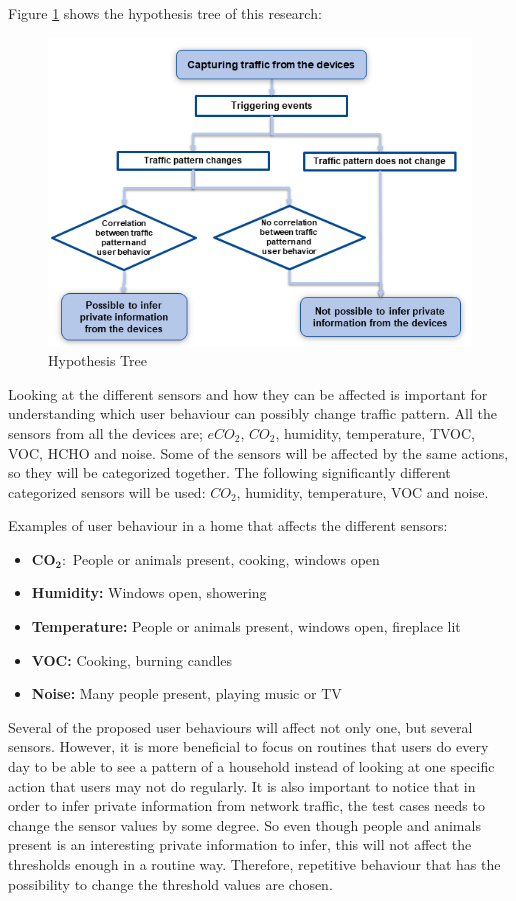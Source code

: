 Figure \ref{fig:HypothesisTree} shows the hypothesis tree of this research:

\begin{figure} [H]
    \includegraphics[width=1\textwidth]{figures/Hypothesistree.png}
    \caption{Hypothesis Tree}
    \label{fig:HypothesisTree}
\end{figure}

Looking at the different sensors and how they can be affected is important for understanding which user behaviour can possibly change traffic pattern. All the sensors from all the devices are; \(eCO_2\), \(CO_2\), humidity, temperature, \gls{TVOC}, \gls{VOC}, HCHO and noise. Some of the sensors will be affected by the same actions, so they will be categorized together. The following significantly different categorized sensors will be used: \(CO_2\), humidity, temperature, VOC and noise. 

Examples of user behaviour in a home that affects the different sensors:
\begin{itemize}
    \item $\mathbf{CO_2:}$ People or animals present, cooking, windows open
    \item \textbf{Humidity:} Windows open, showering
    \item \textbf{Temperature:} People or animals present, windows open, fireplace lit
    \item \textbf{VOC:} Cooking, burning candles
    \item \textbf{Noise:} Many people present, playing music or TV
\end{itemize}

Several of the proposed user behaviours will affect not only one, but several sensors. However, it is more beneficial to focus on routines that users do every day to be able to see a pattern of a household instead of looking at one specific action that users may not do regularly. It is also important to notice that in order to infer private information from network traffic, the test cases needs to change the sensor values by some degree. So even though people and animals present is an interesting private information to infer, this will not affect the thresholds enough in a routine way. Therefore, repetitive behaviour that has the possibility to change the threshold values are chosen. 

